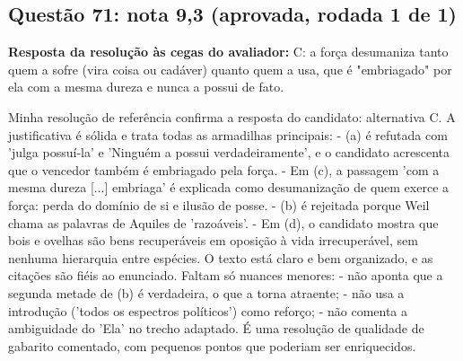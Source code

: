 \documentclass{article}%
\begin{document}
\subsection*{Questão 71: nota 9,3 (aprovada, rodada 1 de 1)}%
\textbf{Resposta da resolução às cegas do avaliador:} C: a força desumaniza tanto quem a sofre (vira coisa ou cadáver) quanto quem a usa, que é "embriagado" por ela com a mesma dureza e nunca a possui de fato.\par %
Minha resolução de referência confirma a resposta do candidato: alternativa C. A justificativa é sólida e trata todas as armadilhas principais:\newline%
{-} (a) é refutada com 'julga possuí{-}la' e 'Ninguém a possui verdadeiramente', e o candidato acrescenta que o vencedor também é embriagado pela força.\newline%
{-} Em (c), a passagem 'com a mesma dureza {[}...{]} embriaga' é explicada como desumanização de quem exerce a força: perda do domínio de si e ilusão de posse.\newline%
{-} (b) é rejeitada porque Weil chama as palavras de Aquiles de 'razoáveis'.\newline%
{-} Em (d), o candidato mostra que bois e ovelhas são bens recuperáveis em oposição à vida irrecuperável, sem nenhuma hierarquia entre espécies.\newline%
\newline%
O texto está claro e bem organizado, e as citações são fiéis ao enunciado. Faltam só nuances menores:\newline%
{-} não aponta que a segunda metade de (b) é verdadeira, o que a torna atraente;\newline%
{-} não usa a introdução ('todos os espectros políticos') como reforço;\newline%
{-} não comenta a ambiguidade do 'Ela' no trecho adaptado.\newline%
\newline%
É uma resolução de qualidade de gabarito comentado, com pequenos pontos que poderiam ser enriquecidos.%
\end{document}
